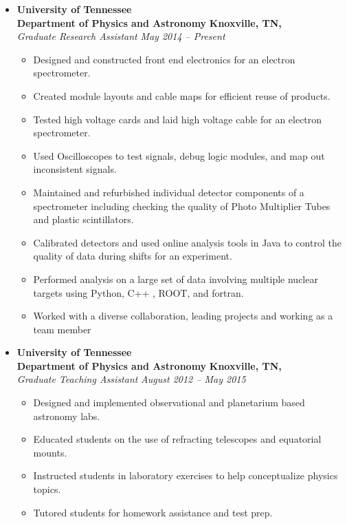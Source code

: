 \begin{itemize}
\parskip=0.1em

\item
\headerrow
{\textbf{University of Tennessee}\\\textbf{Department of Physics and Astronomy }}
{\textbf{  Knoxville, TN,}}
\\
\headerrow
{\emph{Graduate Research Assistant }}
{\emph{May 2014 -- Present}}
\begin{itemize}
	\item Designed and constructed front end electronics for an electron spectrometer.
	\item Created module layouts and cable maps for efficient reuse of products.
	\item Tested high voltage cards and laid high voltage cable for an electron spectrometer.
	\item Used Oscilloscopes to test signals, debug logic modules, and map out inconsistent signals.  
	\item Maintained and refurbished individual detector components of a spectrometer including checking the quality of Photo Multiplier Tubes and plastic scintillators.
	\item Calibrated detectors and used online analysis tools in Java to control the quality of data during shifts for an experiment. 
	\item Performed analysis on a large set of data involving multiple nuclear targets using Python, C++ , ROOT, and fortran. 
	\item Worked with a diverse collaboration, leading projects and working as a team member
\end{itemize}
\vspace{0.85cm}
\item
\headerrow
{\textbf{University of Tennessee}\\\textbf{Department of Physics and Astronomy }}
{\textbf{  Knoxville, TN,}}
\\
\headerrow
{\emph{Graduate Teaching Assistant }}
{\emph{August 2012 -- May 2015}}
\begin{itemize}
	\item Designed and implemented observational and planetarium based astronomy labs.
	\item Educated students on the use of refracting telescopes and equatorial mounts.
	\item Instructed students in laboratory exercises to help conceptualize physics topics.
	\item Tutored students for homework assistance and test prep.

\end{itemize}
\end{itemize}
